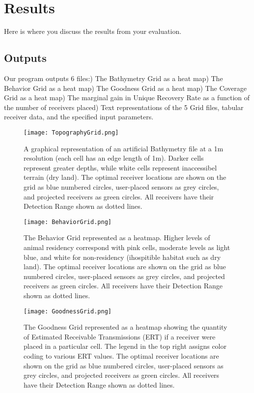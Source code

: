 \chapter{Results}

Here is where you discuss the results from your evaluation.
\section{Outputs}
Our program outputs 6 files:) The Bathymetry Grid as a heat map) The Behavior Grid as a heat map) The Goodness Grid as a heat map) The Coverage Grid as a heat map) The marginal gain in Unique Recovery Rate as a function of the number of receivers placed) Text representations of the 5 Grid files, tabular receiver data, and the specified input parameters.\newline
\begin{figure}[h!]
	\label{outputGraphs}
	\texttt{[image: TopographyGrid.png]}
	\caption{A graphical representation of an artificial Bathymetry file at a 1m resolution (each cell has an edge length of 1m).  Darker cells represent greater depths, while white cells represent inaccessibel terrain (dry land).  The optimal receiver locations are shown on the grid as blue numbered circles, user-placed sensors as grey circles, and projected receivers as green circles.  All receivers have their Detection Range shown as dotted lines.}\label{bathyGraph}
\end{figure}

\begin{figure}[t]
	\texttt{[image: BehaviorGrid.png]}
	\caption{The Behavior Grid represented as a heatmap.  Higher levels of animal residency correspond with pink cells, moderate levels as light blue, and white for non-residency (ihospitible habitat such as  dry land).  The optimal receiver locations are shown on the grid as blue numbered circles, user-placed sensors as grey circles, and projected receivers as green circles.  All receivers have their Detection Range shown as dotted lines.}\label{animalGraph}
\end{figure}

\begin{figure}[t]
	\texttt{[image: GoodnessGrid.png]}
	\caption{The Goodness Grid represented as a heatmap showing the quantity of Estimated Receivable Transmissions (ERT) if a receiver were placed in a particular cell.  The legend in the top right assigns color coding to various ERT values. The optimal receiver locations are shown on the grid as blue numbered circles, user-placed sensors as grey circles, and projected receivers as green circles.  All receivers have their Detection Range shown as dotted lines.} \label{goodnessGraph}
\end{figure}

